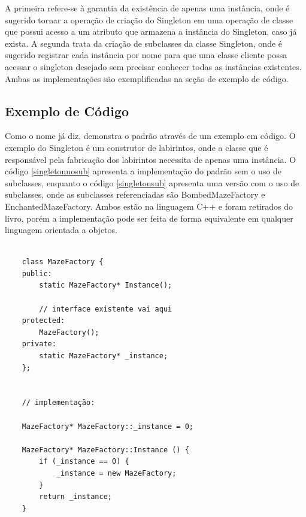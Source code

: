 A primeira refere-se à garantia da existência de 
apenas uma instância, onde é sugerido tornar a operação 
de criação do Singleton em uma operação de classe 
que possui acesso a um atributo que armazena a 
instância do Singleton, caso já exista. A segunda 
trata da criação de subclasses da classe Singleton, 
onde é sugerido registrar cada instância por nome 
para que uma classe cliente possa acessar o singleton 
desejado sem precisar conhecer todas as instâncias 
existentes. Ambas as implementações são 
exemplificadas na seção de exemplo de código.


\subsection*{Exemplo de Código}

Como o nome já diz, demonstra o padrão através de 
um exemplo em código. O exemplo do Singleton é um 
construtor de labirintos, onde a classe que é 
responsável pela fabricação dos labirintos necessita 
de apenas uma instância. O código \ref{singletonnosub}
apresenta a implementação do padrão sem o uso de 
subclasses, enquanto o código \ref{singletonsub} 
apresenta uma versão com o uso de subclasses, 
onde as subclasses referenciadas são BombedMazeFactory  
e EnchantedMazeFactory. 
Ambos estão na linguagem C++ e foram retirados 
do livro, porém a implementação pode ser feita 
de forma equivalente em qualquer linguagem 
orientada a objetos.

\begin{lstlisting}[caption={Exemplo de Singleton sem subclasses}, label=singletonnosub]
    
    class MazeFactory {
    public:
        static MazeFactory* Instance();

        // interface existente vai aqui
    protected:
        MazeFactory();
    private:
        static MazeFactory* _instance;
    };


    // implementação:

    MazeFactory* MazeFactory::_instance = 0;

    MazeFactory* MazeFactory::Instance () {
        if (_instance == 0) {
            _instance = new MazeFactory;
        } 
        return _instance;
    } 

\end{lstlisting}


